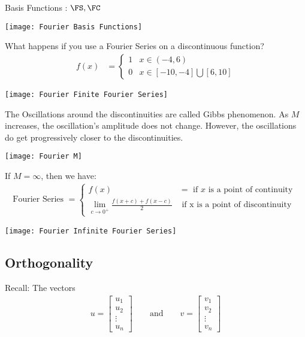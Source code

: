 Basis Functions : $\FS, \FC$
%
\begin{center}
  \texttt{[image: Fourier Basis Functions]}
\end{center}

What happens if you use a Fourier Series on a discontinuous function?
%
\begin{align}
  f(x) & =
  \begin{cases}
    1 & x \in (-4, 6)\\
    0 & x \in [-10, -4] \bigcup [6, 10]
  \end{cases}
\end{align}

\begin{center}
  \texttt{[image: Fourier Finite Fourier Series]}
\end{center}

The Oscillations around the discontinuities are called Gibbs phenomenon. As
$M$ increases, the oscillation's amplitude does not change. However, the
oscillations do get progressively closer to the discontinuities.

\begin{center}
  \texttt{[image: Fourier M]}
\end{center}

If $M = \infty$, then we have:
%
\begin{align}
  \text{Fourier Series } =
  \begin{cases}
    f(x) & = \text{ if $x$ is a point of continuity }\\
    \lim_{c \to 0^+} \frac{f(x + c) + f(x - c)}{2}
    & \text{ if x is a point of discontinuity}
  \end{cases}
\end{align}

\begin{center}
  \texttt{[image: Fourier Infinite Fourier Series]}
\end{center}

\subsection{Orthogonality}

Recall: The vectors
\begin{align}
  u =
  \begin{bmatrix}
    u_1\\
    u_2\\
    \vdots\\
    u_n
  \end{bmatrix}
  \qquad \text{and} \qquad
  v =
  \begin{bmatrix}
    v_1\\
    v_2\\
    \vdots\\
    v_n
  \end{bmatrix}
\end{align}

